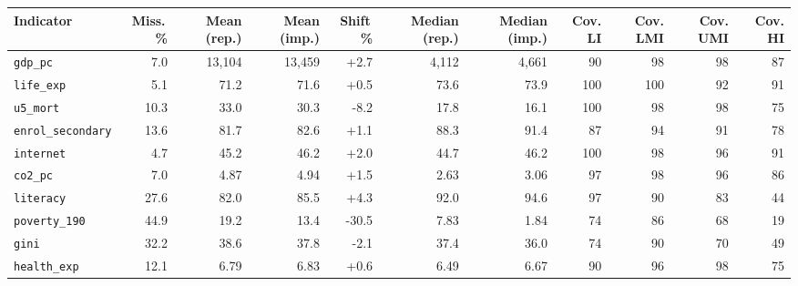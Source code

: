 \footnotesize
\begin{tabular}{lrrrrrrrrrr}
\toprule
Indicator & Miss.\,\% & Mean (rep.) & Mean (imp.) & Shift\,\% & Median (rep.) & Median (imp.) & Cov. LI & Cov. LMI & Cov. UMI & Cov. HI \\
\midrule
\texttt{gdp\_pc} & 7.0 & 13,104 & 13,459 & +2.7 & 4,112 & 4,661 & 90 & 98 & 98 & 87 \\
\texttt{life\_exp} & 5.1 & 71.2 & 71.6 & +0.5 & 73.6 & 73.9 & 100 & 100 & 92 & 91 \\
\texttt{u5\_mort} & 10.3 & 33.0 & 30.3 & -8.2 & 17.8 & 16.1 & 100 & 98 & 98 & 75 \\
\texttt{enrol\_secondary} & 13.6 & 81.7 & 82.6 & +1.1 & 88.3 & 91.4 & 87 & 94 & 91 & 78 \\
\texttt{internet} & 4.7 & 45.2 & 46.2 & +2.0 & 44.7 & 46.2 & 100 & 98 & 96 & 91 \\
\texttt{co2\_pc} & 7.0 & 4.87 & 4.94 & +1.5 & 2.63 & 3.06 & 97 & 98 & 96 & 86 \\
\texttt{literacy} & 27.6 & 82.0 & 85.5 & +4.3 & 92.0 & 94.6 & 97 & 90 & 83 & 44 \\
\texttt{poverty\_190} & 44.9 & 19.2 & 13.4 & -30.5 & 7.83 & 1.84 & 74 & 86 & 68 & 19 \\
\texttt{gini} & 32.2 & 38.6 & 37.8 & -2.1 & 37.4 & 36.0 & 74 & 90 & 70 & 49 \\
\texttt{health\_exp} & 12.1 & 6.79 & 6.83 & +0.6 & 6.49 & 6.67 & 90 & 96 & 98 & 75 \\
\bottomrule
\end{tabular}
